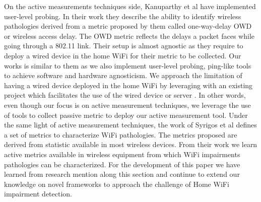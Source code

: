 On the active measurements techniques side, Kanuparthy et al \cite{can_user_level_probing} have implemented user-level probing. In their work they describe the ability to identify wireless pathologies derived from a metric proposed by them called one-way-delay OWD or wireless access delay. The OWD metric reflects the delays a packet faces while going through a 802.11 link. Their setup is almost agnostic as they require to deploy a wired device in the home WiFi for their metric to be collected. Our works is similar to them as we also implement user-level probing, ping-like tools to achieve software and hardware agnosticism. We approach the limitation of having a wired device deployed in the home WiFi by leveraging with an existing project which facilitates the use of the wired device or server \cite{hostview}. In other words, even though our focus is on active measurement techniques, we leverage the use of tools to collect passive metric to deploy our active measurement tool. Under the same light of active measurement techniques, the work of Syrigos et al \cite{WLAN_Troubleshooting} defines a set of metrics to characterize WiFi pathologies. The metrics proposed are derived from statistic available in most wireless devices. From their work we learn active metrics available in wireless equipment from which WiFi impairments pathologies can be characterized.
For the development of this paper we have learned from research mention along this section and continue to extend our knowledge on novel frameworks to approach the challenge of Home WiFi impairment detection.

